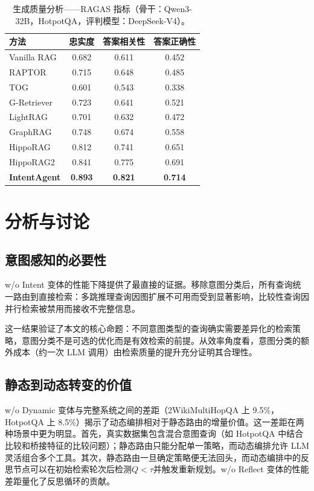 \documentclass[runningheads]{llncs}
\begin{document}
\begin{table}[htbp]
\centering
\caption{生成质量分析——RAGAS 指标（骨干：Qwen3-32B，HotpotQA，评判模型：DeepSeek-V4）。}
\label{tab:ragas}
\begin{tabular}{l|ccc}
\toprule
\textbf{方法} & \textbf{忠实度} & \textbf{答案相关性} & \textbf{答案正确性} \\
\midrule
Vanilla RAG & 0.682 & 0.611 & 0.452 \\
RAPTOR & 0.715 & 0.648 & 0.485 \\
TOG & 0.601 & 0.543 & 0.338 \\
G-Retriever & 0.723 & 0.641 & 0.521 \\
LightRAG & 0.701 & 0.632 & 0.472 \\
GraphRAG & 0.748 & 0.674 & 0.558 \\
HippoRAG & 0.812 & 0.741 & 0.651 \\
HippoRAG2 & 0.841 & 0.775 & 0.691 \\
\midrule
\textbf{IntentAgent} & \textbf{0.893} & \textbf{0.821} & \textbf{0.714} \\
\bottomrule
\end{tabular}
\end{table}

\section{分析与讨论}

\subsection{意图感知的必要性}

w/o Intent 变体的性能下降提供了最直接的证据。移除意图分类后，所有查询统一路由到直接检索：多跳推理查询因图扩展不可用而受到显著影响，比较性查询因并行检索被禁用而接收不完整信息。

这一结果验证了本文的核心命题：不同意图类型的查询确实需要差异化的检索策略，意图分类不是可选的优化而是有效检索的前提。从效率角度看，意图分类的额外成本（约一次 LLM 调用）由检索质量的提升充分证明其合理性。

\subsection{静态到动态转变的价值}

w/o Dynamic 变体与完整系统之间的差距（2WikiMultiHopQA 上 9.5\%，HotpotQA 上 8.5\%）揭示了动态编排相对于静态路由的增量价值。这一差距在两种场景中更为明显。首先，真实数据集包含混合意图查询（如 HotpotQA 中结合比较和桥接特征的比较问题）；静态路由只能分配单一策略，而动态编排允许 LLM 灵活组合多个工具。其次，静态路由一旦确定策略便无法回头，而动态编排中的反思节点可以在初始检索轮次后检测$Q < \tau$并触发重新规划。w/o Reflect 变体的性能差距量化了反思循环的贡献。
\end{document}
